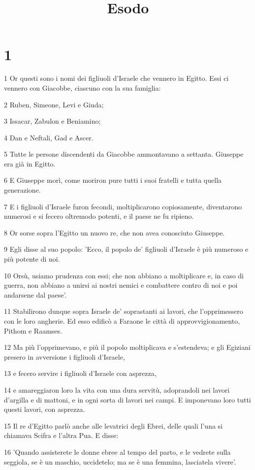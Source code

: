 

\title{Esodo}


\chapter{1}

\par 1 Or questi sono i nomi dei figliuoli d'Israele che vennero in Egitto. Essi ci vennero con Giacobbe, ciascuno con la sua famiglia:
\par 2 Ruben, Simeone, Levi e Giuda;
\par 3 Issacar, Zabulon e Beniamino;
\par 4 Dan e Neftali, Gad e Ascer.
\par 5 Tutte le persone discendenti da Giacobbe ammontavano a settanta. Giuseppe era già in Egitto.
\par 6 E Giuseppe morì, come moriron pure tutti i suoi fratelli e tutta quella generazione.
\par 7 E i figliuoli d'Israele furon fecondi, moltiplicarono copiosamente, diventarono numerosi e si fecero oltremodo potenti, e il paese ne fu ripieno.
\par 8 Or sorse sopra l'Egitto un nuovo re, che non avea conosciuto Giuseppe.
\par 9 Egli disse al suo popolo: 'Ecco, il popolo de' figliuoli d'Israele è più numeroso e più potente di noi.
\par 10 Orsù, usiamo prudenza con essi; che non abbiano a moltiplicare e, in caso di guerra, non abbiano a unirsi ai nostri nemici e combattere contro di noi e poi andarsene dal paese'.
\par 11 Stabilirono dunque sopra Israele de' soprastanti ai lavori, che l'opprimessero con le loro angherie. Ed esso edificò a Faraone le città di approvvigionamento, Pithom e Raamses.
\par 12 Ma più l'opprimevano, e più il popolo moltiplicava e s'estendeva; e gli Egiziani presero in avversione i figliuoli d'Israele,
\par 13 e fecero servire i figliuoli d'Israele con asprezza,
\par 14 e amareggiaron loro la vita con una dura servitù, adoprandoli nei lavori d'argilla e di mattoni, e in ogni sorta di lavori nei campi. E imponevano loro tutti questi lavori, con asprezza.
\par 15 Il re d'Egitto parlò anche alle levatrici degli Ebrei, delle quali l'una si chiamava Scifra e l'altra Pua. E disse:
\par 16 'Quando assisterete le donne ebree al tempo del parto, e le vedrete sulla seggiola, se è un maschio, uccidetelo; ma se è una femmina, lasciatela vivere'.
